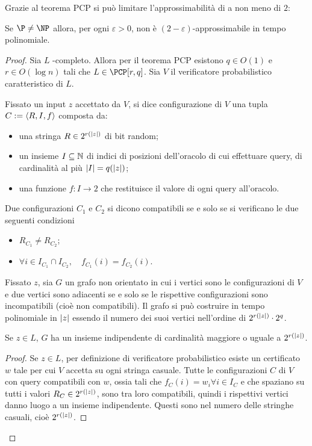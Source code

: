 Grazie al teorema PCP si può limitare l'approssimabilità di \IndependentSet a non meno di $2$:
\begin{theorem}\label{thm:ind_set_inapprox}
	Se $\P\neq\NP$ allora, per ogni $\varepsilon>0$, \IndependentSet non è $(2-\varepsilon)$-approssimabile in tempo polinomiale.
\end{theorem}
\begin{proof}
	Sia $L$ \NP-completo. Allora per il teorema PCP esistono $q\in O(1)$ e $r\in O(\log n)$ tali che $L\in\PCP[r,q]$.
	Sia $V$ il verificatore probabilistico caratteristico di $L$.

	Fissato un input $z$ accettato da $V$, si dice configurazione di $V$ una tupla $C:=\langle R,I,f \rangle$ composta da:
	\begin{itemize}
		\item una stringa $R\in 2^{r(|z|)}$ di bit random;
		\item un insieme $I\subseteq\mathbb N$ di indici di posizioni dell'oracolo di cui effettuare query, di cardinalità al più $| I |=q(|z|)$;
		\item una funzione $f:I\to 2$ che restituisce il valore di ogni query all'oracolo.
	\end{itemize}
	Due configurazioni $C_1$ e $C_2$ si dicono compatibili se e solo se si verificano le due seguenti condizioni
	\begin{itemize}
		\item $R_{C_1}\neq R_{C_2}$;
		\item $\forall i\in I_{C_1}\cap I_{C_2},\quad f_{C_1}(i)=f_{C_2}(i)$.
	\end{itemize}

	Fissato $z$, sia $G$ un grafo non orientato in cui i vertici sono le configurazioni di $V$ e due vertici sono adiacenti se e solo se le rispettive configurazioni sono incompatibili (cioè non compatibili).
	Il grafo si può costruire in tempo polinomiale in $|z|$ essendo il numero dei suoi vertici nell'ordine di $2^{r(|z|)}\cdot 2^q$.

	\begin{fact}\label{fac:indip1}
		Se $z\in L$, $G$ ha un insieme indipendente di cardinalità maggiore o uguale a $2^{r(|z|)}$.
	\end{fact}
	\begin{proof}
		Se $z\in L$, per definizione di verificatore probabilistico esiste un certificato $w$ tale per cui $V$ accetta su ogni stringa casuale.
		Tutte le configurazioni $C$ di $V$ con query compatibili con $w$, ossia tali che $f_C(i)=w_i\forall i\in I_C$ e che spaziano su tutti i valori $R_C\in 2^{r(|z|)}$, sono tra loro compatibili, quindi i rispettivi vertici danno luogo a un insieme indipendente.
		Questi sono nel numero delle stringhe casuali, cioè $2^{r(|z|)}$.
	\end{proof}


\end{proof}
